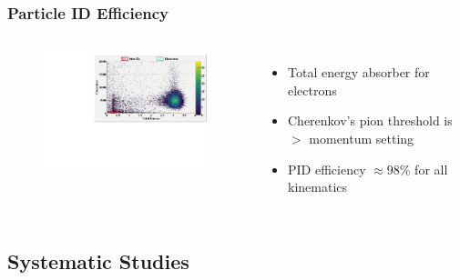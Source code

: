 \documentclass[12pt,usenames,dvipsnames]{beamer}
\begin{document}
\begin{frame}{}
\frametitle{Particle ID Efficiency}
\begin{columns}
\begin{figure}[t]%
	\includegraphics[width=8cm]{../images/Thesis/PID_2d}
\end{figure}
\begin{itemize}
	\item Total energy absorber for electrons
	\item Cherenkov's pion threshold is $>$ momentum setting
	\item PID efficiency $\approx 98\%$  for all kinematics 
\end{itemize}

\end{columns}	
\end{frame}

\subsection[Systematic Studies]{Systematic Studies}
\end{document}
